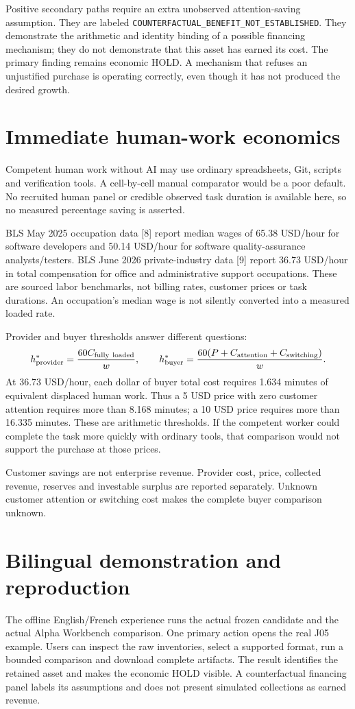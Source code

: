 \documentclass[11pt,a4paper]{article}
\newcommand{\code}[1]{\texttt{#1}}
\begin{document}
Positive secondary paths require an extra unobserved attention-saving assumption.
They are labeled \code{COUNTERFACTUAL\_BENEFIT\_NOT\_ESTABLISHED}. They demonstrate
the arithmetic and identity binding of a possible financing mechanism; they do
not demonstrate that this asset has earned its cost. The primary finding remains
economic HOLD. A mechanism that refuses an unjustified purchase is operating
correctly, even though it has not produced the desired growth.

\section{Immediate human-work economics}
Competent human work without AI may use ordinary spreadsheets, Git, scripts and
verification tools. A cell-by-cell manual comparator would be a poor default.
No recruited human panel or credible observed task duration is available here,
so no measured percentage saving is asserted.

BLS May 2025 occupation data [8] report median wages of 65.38 USD/hour for software
developers and 50.14 USD/hour for software quality-assurance analysts/testers.
BLS June 2026 private-industry data [9] report 36.73 USD/hour in total compensation
for office and administrative support occupations. These are sourced labor
benchmarks, not billing rates, customer prices or task durations. An occupation's
median wage is not silently converted into a measured loaded rate.

Provider and buyer thresholds answer different questions:
\[
h^*_{\rm provider}=\frac{60C_{\rm fully\ loaded}}{w},\qquad
h^*_{\rm buyer}=\frac{60(P+C_{\rm attention}+C_{\rm switching})}{w}.
\]
At 36.73 USD/hour, each dollar of buyer total cost requires 1.634 minutes of
equivalent displaced human work. Thus a 5 USD price with zero customer attention
requires more than 8.168 minutes; a 10 USD price requires more than 16.335 minutes.
These are arithmetic thresholds. If the competent worker could complete the
task more quickly with ordinary tools, that comparison would not support the
purchase at those prices.

Customer savings are not enterprise revenue. Provider cost, price, collected
revenue, reserves and investable surplus are reported separately. Unknown
customer attention or switching cost makes the complete buyer comparison unknown.

\section{Bilingual demonstration and reproduction}
The offline English/French experience runs the actual frozen candidate and the
actual Alpha Workbench comparison. One primary action opens the real J05 example.
Users can inspect the raw inventories, select a supported format, run a bounded
comparison and download complete artifacts. The result identifies the retained
asset and makes the economic HOLD visible. A counterfactual financing panel labels
its assumptions and does not present simulated collections as earned revenue.
\end{document}
